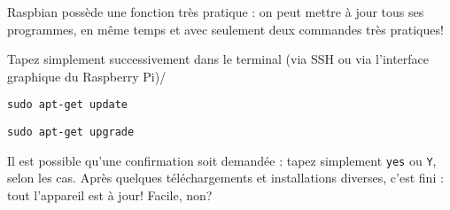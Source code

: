 Raspbian possède une fonction très pratique : on peut mettre à jour tous ses programmes, en même temps et avec seulement deux commandes très pratiques!

Tapez simplement successivement dans le terminal (via SSH ou via l'interface graphique du Raspberry Pi)/

\texttt{sudo apt-get update}

\texttt{sudo apt-get upgrade}

Il est possible qu'une confirmation soit demandée : tapez simplement \texttt{yes} ou \texttt{Y}, selon les cas.
Après quelques téléchargements et installations diverses, c'est fini : tout l'appareil est à jour! Facile, non?